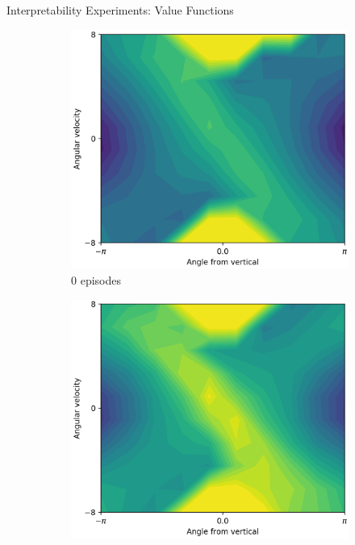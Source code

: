 \documentclass{beamer}
\begin{document}
\begin{frame}{Interpretability Experiments: Value Functions}
  \begin{figure}[t]
    \centering
    \begin{subfigure}{0.30\linewidth}
      \centering
      \includegraphics[width=0.9\linewidth,trim=0 0 0 0,clip]{assets/ref_plots/value_model_refcolexps_r10c10_1_ep0}
      \caption{0 episodes}
    \end{subfigure}
    \begin{subfigure}{0.30\linewidth}
      \centering
      \includegraphics[width=0.9\linewidth,trim=0 0 0 0,clip]{assets/ref_plots/value_model_refcolexps_r10c10_1_ep1000}

\end{subfigure}
\end{figure}
\end{frame}
\end{document}
